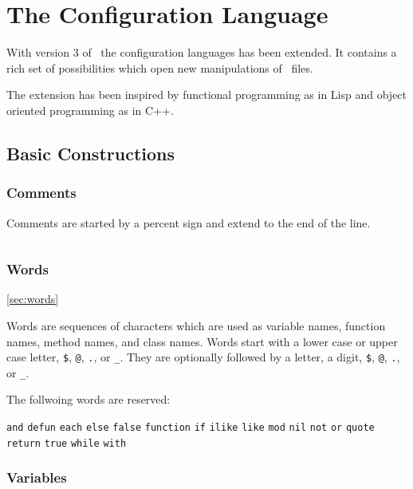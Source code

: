 \documentclass[11pt,a4paper]{scrbook}
\begin{document}

\chapter{The  Configuration Language}

With version 3 of \BibTool\ the configuration languages has been extended. It
contains a rich set of possibilities which open new manipulations of \BibTeX\
files.

The extension has been inspired by functional programming as in Lisp and
object oriented programming as in C++.

\section{Basic Constructions}


\subsection{Comments}

Comments are started by a percent sign and extend to the end of the line.

\begin{lstlisting}[language=BibTool]
% this is a comment
\end{lstlisting}

\subsection{Words}\ref{sec:words}

Words are sequences of characters which are used as variable names, function
names, method names, and class names. Words start with a lower case or upper
case letter, \verb|$|, \verb|@|, \verb|.|, or \verb|_|. They are optionally
followed by a letter, a digit, \verb|$|, \verb|@|, \verb|.|, or \verb|_|.

The follwoing words are reserved:

\verb|and|
\verb|defun|
\verb|each|
\verb|else|
\verb|false|
\verb|function|
\verb|if|
\verb|ilike|
\verb|like|
\verb|mod|
\verb|nil|
\verb|not|
\verb|or|
\verb|quote|
\verb|return|
\verb|true|
\verb|while|
\verb|with|

\subsection{Variables}
\end{document}
